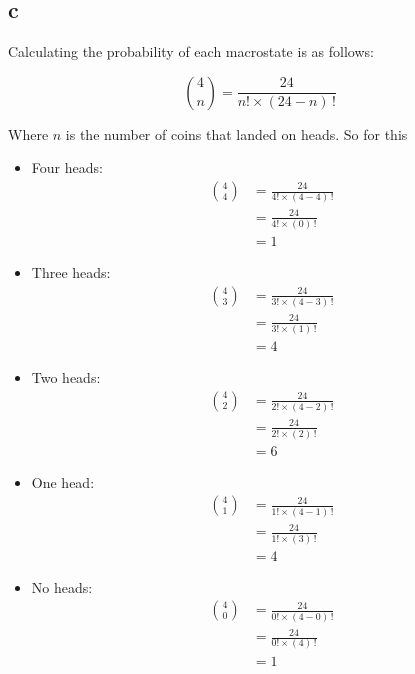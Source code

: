 \documentclass[a4paper,floatfix,nofootinbib]{article}
\begin{document}
\subsection*{c}
Calculating the probability of each macrostate is as follows:

\begin{equation}
    \binom{4}{n} = \frac{ 24 }{ n! \times \left( 24 - n \right) \,! }
\end{equation}

Where $n$ is the number of coins that landed on heads. So for this


\begin{itemize}
    \item Four heads:
        \begin{align*}
            \binom{4}{4} &= \frac{ 24 }{ 4! \times \left( 4 - 4 \right) \,! } \\
            &= \frac{ 24 }{ 4! \times \left( 0 \right) \,! }                   \\
            &= 1
        \end{align*}

    \item Three heads:
        \begin{align*}
            \binom{4}{3} &= \frac{ 24 }{ 3! \times \left( 4 - 3 \right) \,! } \\
            &= \frac{ 24 }{ 3! \times \left( 1 \right) \,! } \\
            &= 4
        \end{align*}

    \item Two heads:
        \begin{align*}
            \binom{4}{2} &= \frac{ 24 }{ 2! \times \left( 4 - 2 \right) \,! } \\
            &= \frac{ 24 }{ 2! \times \left( 2 \right) \,! } \\
            &= 6
        \end{align*}

    \item One head:
        \begin{align*}
            \binom{4}{1} &= \frac{ 24 }{ 1! \times \left( 4 - 1 \right) \,! } \\
            &= \frac{ 24 }{ 1! \times \left( 3 \right) \,! } \\
            &= 4
        \end{align*}

    \item No heads:
        \begin{align*}
            \binom{4}{0} &= \frac{ 24 }{ 0! \times \left( 4 - 0 \right) \,! } \\
            &= \frac{ 24 }{ 0! \times \left( 4 \right) \,! } \\
            &= 1
        \end{align*}
\end{itemize} 
\end{document}
